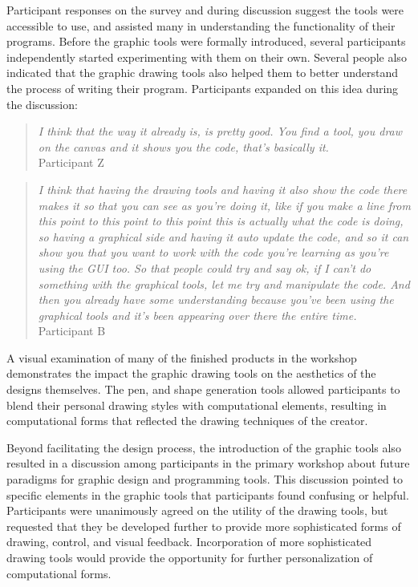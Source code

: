 \documentclass{sigchi}
\begin{document}
Participant responses on the survey and during discussion suggest the tools were accessible to use, and assisted many in understanding the functionality of their programs. Before the graphic tools were formally introduced, several participants independently started experimenting with them on their own. Several people also indicated that the graphic drawing tools also helped them to better understand the process of writing their program. Participants expanded on this idea during the discussion:
\begin{quotation}
\textit{I think that the way it already is, is pretty good. You find a tool, you draw on the canvas and it shows you the code, that's basically it.}
\\Participant Z
\end{quotation}

\begin{quotation}
\textit{I think that having the drawing tools and having it also show the code there makes it so that you can see as you're doing it, like if you make a line from this point to this point to this point this is actually what the code is doing, so having a graphical side and having it auto update the code, and so it can show you that you want to work with the code you're learning as you're using the GUI too. So that people could try and say ok, if I can't do something with the graphical tools, let me try and manipulate the code. And then you already have some understanding because you've been using the graphical tools and it's been appearing over there the entire time.}
\\Participant B
\end{quotation}

A visual examination of many of the finished products in the workshop demonstrates the impact the graphic drawing tools on the aesthetics of the designs themselves. The pen, and shape generation tools allowed participants to blend their personal drawing styles with computational elements, resulting in computational forms that reflected the drawing techniques of the creator. 

Beyond facilitating the design process, the introduction of the graphic tools also resulted in a discussion among participants in the primary workshop about future paradigms for graphic design and programming tools. This discussion pointed to specific elements in the graphic tools that participants found confusing or helpful. Participants were unanimously agreed on the utility of the drawing tools, but requested that they be developed further to provide more sophisticated forms of drawing, control, and visual feedback. Incorporation of more sophisticated drawing tools would provide the opportunity for further personalization of computational forms.
\end{document}
